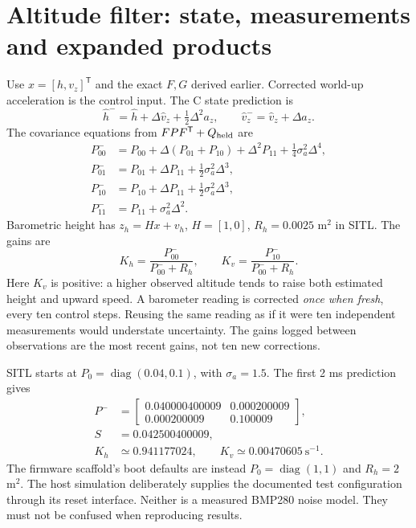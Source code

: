\section{Altitude filter: state, measurements and expanded products}
Use $x=[h,v_z]^{\mathsf T}$ and the exact $F,G$ derived earlier. Corrected
world-up acceleration is the control input. The C state prediction is
\begin{equation}
\hat h^-=\hat h+\Delta\hat v_z+\tfrac12\Delta^2 a_z,\qquad
\hat v_z^-=\hat v_z+\Delta a_z.
\end{equation}
The covariance equations from $FPF^{\mathsf T}+Q_{\rm held}$ are
\begin{align}
P^-_{00}&=P_{00}+\Delta(P_{01}+P_{10})+\Delta^2P_{11}
 +\tfrac14\sigma_a^2\Delta^4,\\
P^-_{01}&=P_{01}+\Delta P_{11}+\tfrac12\sigma_a^2\Delta^3,\\
P^-_{10}&=P_{10}+\Delta P_{11}+\tfrac12\sigma_a^2\Delta^3,\\
P^-_{11}&=P_{11}+\sigma_a^2\Delta^2.
\end{align}
Barometric height has $z_h=Hx+v_h$, $H=[1,0]$, $R_h=0.0025$ m$^2$ in
SITL. The gains are
\begin{equation}
K_h=\frac{P^-_{00}}{P^-_{00}+R_h},\qquad
K_v=\frac{P^-_{10}}{P^-_{00}+R_h}.
\end{equation}
Here $K_v$ is positive: a higher observed altitude tends to raise both
estimated height and upward speed. A barometer reading is corrected
\emph{once when fresh}, every ten control steps. Reusing the same reading as
if it were ten independent measurements would understate uncertainty.
The gains logged between observations are the most recent gains, not ten
new corrections.

SITL starts at $P_0=\operatorname{diag}(0.04,0.1)$, with $\sigma_a=1.5$.
The first 2 ms prediction gives
\begin{align}
P^-&=\begin{bmatrix}0.040000400009&0.000200009\\
0.000200009&0.100009\end{bmatrix},\\
S&=0.042500400009,\\
K_h&\simeq0.941177024,\qquad K_v\simeq0.00470605\ \mathrm{s}^{-1}.
\end{align}
The firmware scaffold's boot defaults are instead $P_0=\operatorname{diag}(1,1)$
and $R_h=2$ m$^2$. The host simulation deliberately supplies the documented
test configuration through its reset interface. Neither is a measured BMP280
noise model. They must not be confused when reproducing results.

